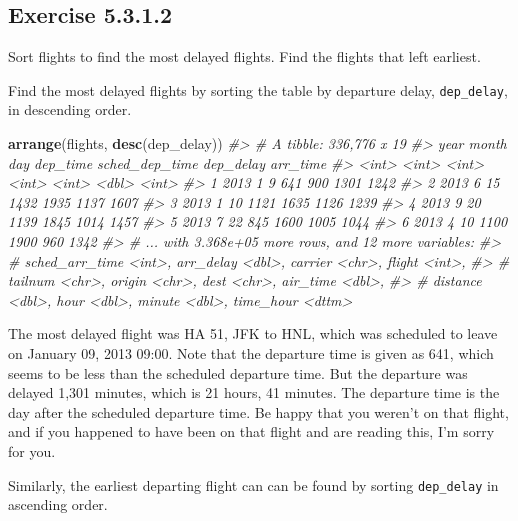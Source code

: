 \documentclass[]{book}
\newenvironment{Shaded}{\begin{snugshade}}{\end{snugshade}}
\newcommand{\CommentTok}[1]{\textcolor[rgb]{0.56,0.35,0.01}{\textit{#1}}}
\newcommand{\KeywordTok}[1]{\textcolor[rgb]{0.13,0.29,0.53}{\textbf{#1}}}
\newcommand{\NormalTok}[1]{#1}
\theoremstyle{plain}
\theoremstyle{remark}
\begin{document}
\hypertarget{exercise-5.3.1.2}{%
\subsection*{\texorpdfstring{Exercise
{5.3.1.2}}{Exercise 5.3.1.2}}\label{exercise-5.3.1.2}}

Sort flights to find the most delayed flights. Find the flights that
left earliest.

Find the most delayed flights by sorting the table by departure delay,
\texttt{dep\_delay}, in descending order.

\begin{Shaded}
\begin{Highlighting}[]
\KeywordTok{arrange}\NormalTok{(flights, }\KeywordTok{desc}\NormalTok{(dep_delay))}
\CommentTok{#> # A tibble: 336,776 x 19}
\CommentTok{#>    year month   day dep_time sched_dep_time dep_delay arr_time}
\CommentTok{#>   <int> <int> <int>    <int>          <int>     <dbl>    <int>}
\CommentTok{#> 1  2013     1     9      641            900      1301     1242}
\CommentTok{#> 2  2013     6    15     1432           1935      1137     1607}
\CommentTok{#> 3  2013     1    10     1121           1635      1126     1239}
\CommentTok{#> 4  2013     9    20     1139           1845      1014     1457}
\CommentTok{#> 5  2013     7    22      845           1600      1005     1044}
\CommentTok{#> 6  2013     4    10     1100           1900       960     1342}
\CommentTok{#> # ... with 3.368e+05 more rows, and 12 more variables:}
\CommentTok{#> #   sched_arr_time <int>, arr_delay <dbl>, carrier <chr>, flight <int>,}
\CommentTok{#> #   tailnum <chr>, origin <chr>, dest <chr>, air_time <dbl>,}
\CommentTok{#> #   distance <dbl>, hour <dbl>, minute <dbl>, time_hour <dttm>}
\end{Highlighting}
\end{Shaded}

The most delayed flight was HA 51, JFK to HNL, which was scheduled to
leave on January 09, 2013 09:00. Note that the departure time is given
as 641, which seems to be less than the scheduled departure time. But
the departure was delayed 1,301 minutes, which is 21 hours, 41 minutes.
The departure time is the day after the scheduled departure time. Be
happy that you weren't on that flight, and if you happened to have been
on that flight and are reading this, I'm sorry for you.

Similarly, the earliest departing flight can can be found by sorting
\texttt{dep\_delay} in ascending order.
\end{document}
